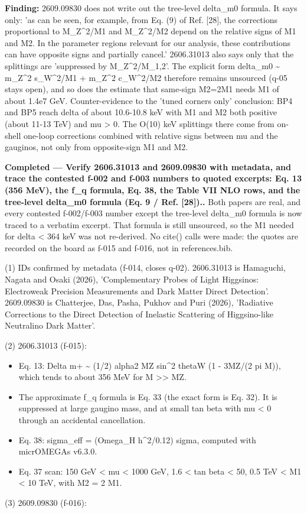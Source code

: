 \documentclass[11pt,a4paper]{article}
\begin{document}
\textbf{Finding:} 2609.09830 does not write out the tree-level delta\_m0 formula. It says only: 'as can be seen, for example, from Eq. (9) of Ref. [28], the corrections proportional to M\_Z\textasciicircum{}2/M1 and M\_Z\textasciicircum{}2/M2 depend on the relative signs of M1 and M2. In the parameter regions relevant for our analysis, these contributions can have opposite signs and partially cancel.' 2606.31013 also says only that the splittings are 'suppressed by M\_Z\textasciicircum{}2/M\_1,2'. The explicit form delta\_m0 \textasciitilde{} m\_Z\textasciicircum{}2 s\_W\textasciicircum{}2/M1 + m\_Z\textasciicircum{}2 c\_W\textasciicircum{}2/M2 therefore remains unsourced (q-05 stays open), and so does the estimate that same-sign M2=2M1 needs M1 of about 1.4e7 GeV. Counter-evidence to the 'tuned corners only' conclusion: BP4 and BP5 reach delta of about 10.6-10.8 keV with M1 and M2 both positive (about 11-13 TeV) and mu \textgreater{} 0. The O(10) keV splittings there come from on-shell one-loop corrections combined with relative signs between mu and the gauginos, not only from opposite-sign M1 and M2.

\textbf{Completed --- Verify 2606.31013 and 2609.09830 with metadata, and trace the contested f-002 and f-003 numbers to quoted excerpts: Eq. 13 (356 MeV), the f\_q formula, Eq. 38, the Table VII NLO rows, and the tree-level delta\_m0 formula (Eq. 9 / Ref. [28])..} Both papers are real, and every contested f-002/f-003 number except the tree-level delta\_m0 formula is now traced to a verbatim excerpt. That formula is still unsourced, so the M1 needed for delta \textless{} 364 keV was not re-derived. No cite() calls were made: the quotes are recorded on the board as f-015 and f-016, not in references.bib.

(1) IDs confirmed by metadata (f-014, closes q-02). 2606.31013 is Hamaguchi, Nagata and Osaki (2026), 'Complementary Probes of Light Higgsinos: Electroweak Precision Measurements and Dark Matter Direct Detection'. 2609.09830 is Chatterjee, Das, Pasha, Pukhov and Puri (2026), 'Radiative Corrections to the Direct Detection of Inelastic Scattering of Higgsino-like Neutralino Dark Matter'.

(2) 2606.31013 (f-015):

\begin{itemize}
  \item Eq. 13: Delta m+ \textasciitilde{} (1/2) alpha2 MZ sin\textasciicircum{}2 thetaW (1 - 3MZ/(2 pi M)), which tends to about 356 MeV for M \textgreater{}\textgreater{} MZ.
  \item The approximate f\_q formula is Eq. 33 (the exact form is Eq. 32). It is suppressed at large gaugino mass, and at small tan beta with mu \textless{} 0 through an accidental cancellation.
  \item Eq. 38: sigma\_eff = (Omega\_H h\textasciicircum{}2/0.12) sigma, computed with micrOMEGAs v6.3.0.
  \item Eq. 37 scan: 150 GeV \textless{} \textbar{}mu\textbar{} \textless{} 1000 GeV, 1.6 \textless{} tan beta \textless{} 50, 0.5 TeV \textless{} M1 \textless{} 10 TeV, with M2 = 2 M1.
\end{itemize}
(3) 2609.09830 (f-016):
\end{document}
